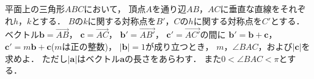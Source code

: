 \documentclass[../../main.tex]{subfiles}
\begin{document}
平面上の三角形$ABC$において，
頂点$A$を通り辺$AB$，$AC$に垂直な直線をそれぞれ$h$，$k$とする．
$B$の$k$に関する対称点を$B'$，$C$の$h$に関する対称点を$C'$とする．
ベクトル$\mathbf{b}=\overrightarrow{AB}$，
$\mathbf{c}=\overrightarrow{AC}$，
$\mathbf{b'}=\overrightarrow{AB'}$，
$\mathbf{c'}=\overrightarrow{AC'}$の間に
$\mathbf{b'}=\mathbf{b}+\mathbf{c}$，
$\mathbf{c'}=m\mathbf{b}+\mathbf{c}$($m$は正の整数)，
$|\mathbf{b}|=1$が成り立つとき，
$m$，$\angle BAC$，および$|\mathbf{c}|$を求めよ．
ただし$|\mathbf{a}|$はベクトル$\mathbf{a}$の長さをあらわす．
また$0<\angle BAC<\pi$とする．
\end{document}
